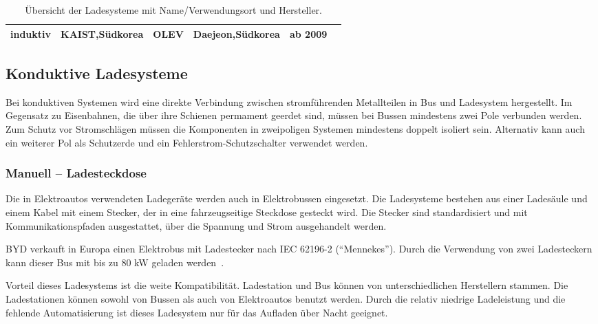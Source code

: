 \begin{table}
\begin{tabularx}{\linewidth}{p{1.5cm}p{1.9cm}p{2.2cm}Xp{2.4cm}p{1.2cm}l}
		         \multicolumn{2}{c}{\multirow{2}{*}{induktiv}}           & \textsc{KAIST},\newline Südkorea                 & OLEV        & Daejeon,\newline Südkorea       & ab 2009          & \cite{5618092}                       \\ \bottomrule
	\end{tabularx}
	\caption[Übersicht der Ladesysteme mit Name/Verwendungsort und Hersteller]{Übersicht der Ladesysteme mit Name/Verwendungsort und Hersteller.}
	\label{uebersichtLadesysteme}
\end{table}


\subsection{Konduktive Ladesysteme} 
Bei konduktiven Systemen wird eine direkte Verbindung zwischen stromführenden Metallteilen in Bus und Ladesystem hergestellt. Im Gegensatz zu Eisenbahnen, die über ihre Schienen permament geerdet sind, müssen bei Bussen mindestens zwei Pole verbunden werden. Zum Schutz vor Stromschlägen müssen die Komponenten in zweipoligen Systemen mindestens doppelt isoliert sein. Alternativ kann auch ein weiterer Pol als Schutzerde und ein Fehlerstrom-Schutzschalter verwendet werden.

\subsubsection{Manuell – Ladesteckdose}
Die in Elektroautos verwendeten Ladegeräte werden auch in Elektrobussen eingesetzt. Die Ladesysteme bestehen aus einer Ladesäule und einem Kabel mit einem Stecker, der in eine fahrzeugseitige Steckdose gesteckt wird. Die Stecker sind standardisiert und mit Kommunikationspfaden ausgestattet, über die Spannung und Strom ausgehandelt werden.

\textsc{BYD} verkauft in Europa einen Elektrobus mit Ladestecker nach IEC 62196-2 ("`Mennekes"'). Durch die Verwendung von zwei Ladesteckern kann dieser Bus mit bis zu 80 kW geladen werden~\cite{bydSpecs4}.

Vorteil dieses Ladesystems ist die weite Kompatibilität. Ladestation und Bus können von unterschiedlichen Herstellern stammen. Die Ladestationen können sowohl von Bussen als auch von Elektroautos benutzt werden. Durch die relativ niedrige Ladeleistung und die fehlende Automatisierung ist dieses Ladesystem nur für das Aufladen über Nacht geeignet.

